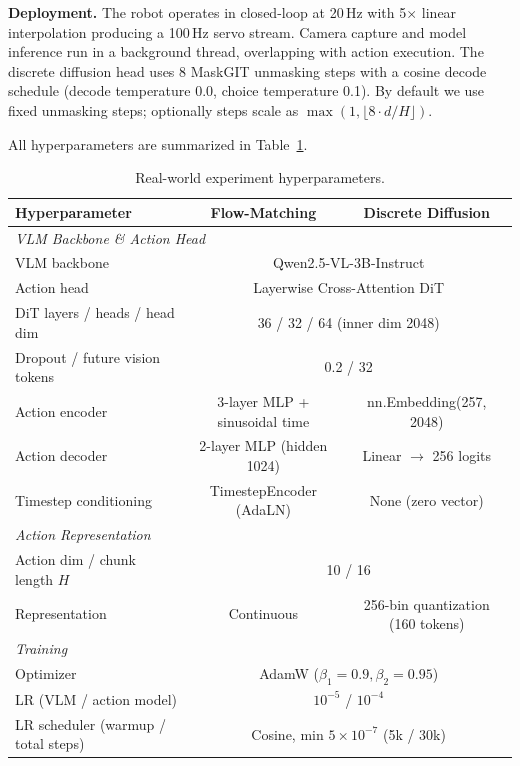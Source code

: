 \documentclass{article}
\begin{document}
\textbf{Deployment.}
The robot operates in closed-loop at 20\,Hz with 5$\times$ linear interpolation producing a 100\,Hz servo stream.
Camera capture and model inference run in a background thread, overlapping with action execution.
The discrete diffusion head uses 8 MaskGIT unmasking steps with a cosine decode schedule (decode temperature 0.0, choice temperature 0.1).
By default we use fixed unmasking steps; optionally steps scale as $\max(1, \lfloor 8 \cdot d / H \rfloor)$.

All hyperparameters are summarized in Table~\ref{tab:real_hyperparams}.



\begin{table}[h]
\centering
\caption{Real-world experiment hyperparameters.}
\label{tab:real_hyperparams}
\begin{tabular}{lcc}
\toprule
\textbf{Hyperparameter} & \textbf{Flow-Matching} & \textbf{Discrete Diffusion} \\
\midrule
\multicolumn{3}{l}{\textit{VLM Backbone \& Action Head}} \\
VLM backbone & \multicolumn{2}{c}{Qwen2.5-VL-3B-Instruct} \\
Action head & \multicolumn{2}{c}{Layerwise Cross-Attention DiT} \\
DiT layers / heads / head dim & \multicolumn{2}{c}{36 / 32 / 64 (inner dim 2048)} \\
Dropout / future vision tokens & \multicolumn{2}{c}{0.2 / 32} \\
Action encoder & 3-layer MLP + sinusoidal time & nn.Embedding(257, 2048) \\
Action decoder & 2-layer MLP (hidden 1024) & Linear $\rightarrow$ 256 logits \\
Timestep conditioning & TimestepEncoder (AdaLN) & None (zero vector) \\
\midrule
\multicolumn{3}{l}{\textit{Action Representation}} \\
Action dim / chunk length $H$ & \multicolumn{2}{c}{10 / 16} \\
Representation & Continuous & 256-bin quantization (160 tokens) \\
\midrule
\multicolumn{3}{l}{\textit{Training}} \\
Optimizer & \multicolumn{2}{c}{AdamW ($\beta_1{=}0.9, \beta_2{=}0.95$)} \\
LR (VLM / action model) & \multicolumn{2}{c}{$10^{-5}$ / $10^{-4}$} \\
LR scheduler (warmup / total steps) & \multicolumn{2}{c}{Cosine, min $5{\times}10^{-7}$ (5k / 30k)} \\

\end{tabular}
\end{table}
\end{document}
